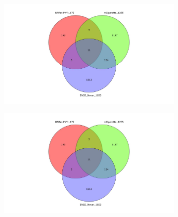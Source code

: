 \documentclass[draft]{article} %
\begin{document}
\begin{figure}[p]
    \centering
    \begin{subfigure}{0.49\linewidth}
        \centering
        \includegraphics[width=\linewidth, trim=7cm 0cm 7cm 0cm, clip]{venn_diagrams/intersect_compare_never.jpg}
    \end{subfigure}
    \hfill
    \begin{subfigure}{0.49\linewidth}
        \centering
        \includegraphics[width=\linewidth, trim=7cm 0cm 7cm 0cm, clip]{venn_diagrams/intersect_compare_never.jpg}
    \end{subfigure}


\end{figure}
\end{document}

